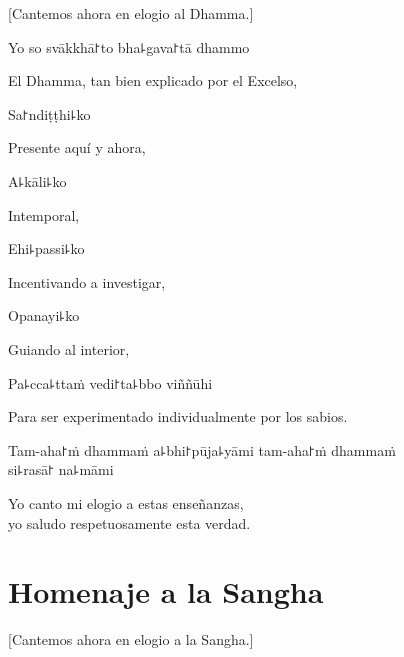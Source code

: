 \begin{english}
  [Cantemos ahora en elogio al Dhamma.]
\end{english}

Yo so svākkhā꜓to bha꜕gava꜓tā dhammo

\begin{english}
  El Dhamma, tan bien explicado por el Excelso,
\end{english}

Sa꜓ndiṭṭhi꜕ko

\begin{english}
  Presente aquí y ahora,
\end{english}

A꜕kāli꜕ko

\begin{english}
  Intemporal,
\end{english}

Ehi꜕passi꜕ko

\begin{english}
  Incentivando a investigar,
\end{english}

Opanayi꜕ko

\begin{english}
  Guiando al interior,
\end{english}

Pa꜕cca꜕ttaṁ vedi꜓ta꜕bbo viññūhi

\begin{english}
  Para ser experimentado individualmente por los sabios.
\end{english}

Tam-aha꜓ṁ dhammaṁ a꜕bhi꜓pūja꜕yāmi tam-aha꜓ṁ dhammaṁ \\si꜕rasā꜓ na꜕māmi

\begin{english}
  Yo canto mi elogio a estas enseñanzas,\\
  yo saludo respetuosamente esta verdad.
\end{english}

\clearpage

\chapter{Homenaje a la Sangha}

\begin{leader}
\end{leader}

\begin{english}
  [Cantemos ahora en elogio a la Sangha.]
\end{english}

